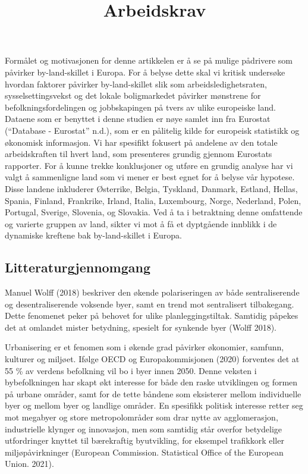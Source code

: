 \documentclass[
  letterpaper,
  DIV=11,
  numbers=noendperiod]{scrartcl}
\title{Arbeidskrav}
\author{}
\date{}
\begin{document}
\maketitle
\ifdefined\Shaded\renewenvironment{Shaded}{\begin{tcolorbox}[sharp corners, breakable, frame hidden, borderline west={3pt}{0pt}{shadecolor}, interior hidden, boxrule=0pt, enhanced]}{\end{tcolorbox}}\fi

Formålet og motivasjonen for denne artikkelen er å se på mulige
pådrivere som påvirker by-land-skillet i Europa. For å belyse dette skal
vi kritisk undersøke hvordan faktorer påvirker by-land-skillet slik som
arbeidsledighetsraten, sysselsettingsvekst og det lokale boligmarkedet
påvirker mønstrene for befolkningsfordelingen og jobbskapingen på tvers
av ulike europeiske land. Dataene som er benyttet i denne studien er
nøye samlet inn fra Eurostat ({``Database - {Eurostat}''} n.d.), som er
en pålitelig kilde for europeisk statistikk og økonomisk informasjon. Vi
har spesifikt fokusert på andelene av den totale arbeidskraften til
hvert land, som presenteres grundig gjennom Eurostats rapporter. For å
kunne trekke konklusjoner og utføre en grundig analyse har vi valgt å
sammenligne land som vi mener er best egnet for å belyse vår hypotese.
Disse landene inkluderer Østerrike, Belgia, Tyskland, Danmark, Estland,
Hellas, Spania, Finland, Frankrike, Irland, Italia, Luxembourg, Norge,
Nederland, Polen, Portugal, Sverige, Slovenia, og Slovakia. Ved å ta i
betraktning denne omfattende og varierte gruppen av land, sikter vi mot
å få et dyptgående innblikk i de dynamiske kreftene bak by-land-skillet
i Europa.

\hypertarget{litteraturgjennomgang}{%
\subsection{Litteraturgjennomgang}\label{litteraturgjennomgang}}

Manuel Wolff (2018) beskriver den økende polariseringen av både
sentraliserende og desentraliserende voksende byer, samt en trend mot
sentralisert tilbakegang. Dette fenomenet peker på behovet for ulike
planleggingstiltak. Samtidig påpekes det at omlandet mister betydning,
spesielt for synkende byer (Wolff 2018).

Urbanisering er et fenomen som i økende grad påvirker økonomier,
samfunn, kulturer og miljøet. Ifølge OECD og Europakommisjonen (2020)
forventes det at 55 \% av verdens befolkning vil bo i byer innen 2050.
Denne veksten i bybefolkningen har skapt økt interesse for både den
raske utviklingen og formen på urbane områder, samt for de tette båndene
som eksisterer mellom individuelle byer og mellom byer og landlige
områder. En spesifikk politisk interesse retter seg mot megabyer og
store metropolområder som drar nytte av agglomerasjon, industrielle
klynger og innovasjon, men som samtidig står overfor betydelige
utfordringer knyttet til bærekraftig byutvikling, for eksempel
trafikkork eller miljøpåvirkninger (European Commission. Statistical
Office of the European Union. 2021).~
\end{document}
